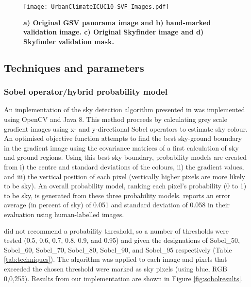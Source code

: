 \documentclass[final,3p,times,authoryear]{elsarticle}
\begin{document}
\begin{figure}
\centering    
\texttt{[image: UrbanClimateICUC10-SVF\_Images.pdf]} 
\caption{\bf a) Original GSV panorama image and b) hand-marked validation image. c) Original Skyfinder image and d) Skyfinder validation mask.}    
 \label{fig:origmarked}  
\end{figure} 



\subsection{Techniques and parameters}
\subsubsection{\cite{Wang2015a} Sobel operator/hybrid probability model}\label{sec:prob}
An implementation of the sky detection algorithm presented in \cite{Wang2015a} was implemented using OpenCV and Java 8. This method proceeds by calculating grey scale gradient images using x- and y-directional Sobel operators to estimate sky colour. An optimised objective function attempts to find the best sky-ground boundary in the gradient image using the covariance matrices of a first calculation of sky and ground regions. Using this best sky boundary, probability models are created from i) the centre and standard deviations of the colours, ii) the gradient values, and iii) the vertical position of each pixel (vertically higher pixels are more likely to be sky). An overall probability model, ranking each pixel's probability (0 to 1) to be sky, is generated from these three probability models. \cite{Wang2015a} reports an error average (in percent of sky) of 0.051 and standard deviation of 0.058 in their evaluation using human-labelled images.

\cite{Wang2015a} did not recommend a probability threshold, so a number of thresholds were tested (0.5, 0.6, 0.7, 0.8, 0.9, and 0.95) and given the designations of Sobel\_50, Sobel\_60, Sobel\_70, Sobel\_80, Sobel\_90, and Sobel\_95 respectively (Table \ref{tab:techniques}). The algorithm was applied to each image and pixels that exceeded the chosen threshold were marked as sky pixels (using blue, RGB 0,0,255). Results from our implementation are shown in Figure \ref{fig:sobolresults}. 


\end{document}
